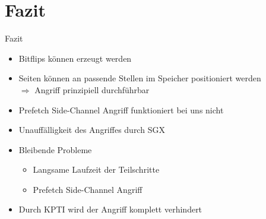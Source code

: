 \documentclass[german,10pt,xcolor=colortbl,compress
]{beamer}
\begin{document}
\section{Fazit}
\begin{frame}{Fazit}
\begin{itemize}
\item Bitflips können erzeugt werden
\item Seiten können an passende Stellen im Speicher positioniert werden
\\$\Rightarrow$ Angriff prinzipiell durchführbar
\item Prefetch Side-Channel Angriff funktioniert bei uns nicht
\item Unauffälligkeit des Angriffes durch SGX
\item Bleibende Probleme
	\begin{itemize}
	\item Langsame Laufzeit der Teilschritte
	\item Prefetch Side-Channel Angriff
	\end{itemize}
\item Durch KPTI wird der Angriff komplett verhindert
\end{itemize}
\end{frame}
	
	
\end{document}
